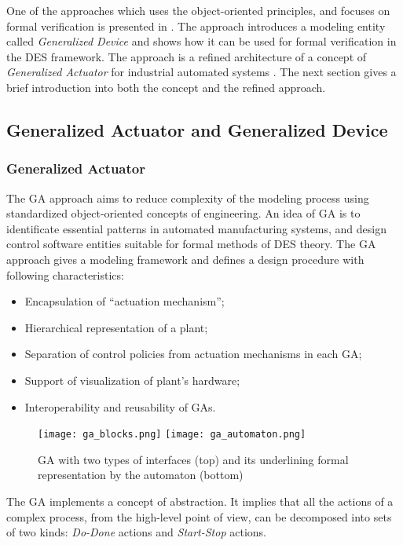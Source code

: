 One of the approaches which uses the object-oriented principles, and focuses on
formal verification is presented in \cite{sartini_architectures_2010}. The
approach introduces a modeling entity called \emph{Generalized Device} and shows
how it can be used for formal verification in the DES framework. The approach is a
refined architecture of a concept of \emph{Generalized Actuator} for industrial
automated systems \cite{faldella_hierarchical_2008}. The next section gives a
brief introduction into both the concept and the refined approach.


\subsection{Generalized Actuator and Generalized Device}

\subsubsection{Generalized Actuator}

The GA approach aims to reduce complexity of the modeling process using
standardized object-oriented concepts of engineering.
An idea of GA is to identificate essential patterns in automated manufacturing
systems, and design control software entities suitable for formal methods of DES
theory. The GA approach gives a modeling framework and defines a design
procedure with following characteristics:
\begin{itemize}
  \item Encapsulation of ``actuation mechanism'';
  \item Hierarchical representation of a plant;
  \item Separation of control policies from actuation mechanisms in each GA;
  \item Support of visualization of plant's hardware;
  \item Interoperability and reusability of GAs.
\end{itemize}

\begin{figure}[!t]
	\centering
	\texttt{[image: ga\_blocks.png]}
	\texttt{[image: ga\_automaton.png]}
	\caption{GA with two types of interfaces (top) and its underlining
	formal representation by the automaton (bottom)}
	\label{fig:ga_blocks}
\end{figure}

The GA implements a concept of abstraction. It implies that all the actions of a
complex process, from the high-level point of view, can be decomposed into sets
of two kinds: \emph{Do-Done} actions and \emph{Start-Stop} actions.

